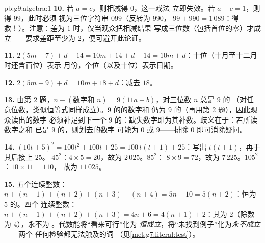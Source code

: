 \begin{solution}{pb:g9:algebra:1}
\textbf{10.} 若 $a = c$，则相减得 $0$，这一戏法
立即失效。若 $a - c = 1$，则得 $99$，此时必须
视为三位字符串 $099$（反转为 $990$，
$99 + 990 = 1\,089$：得救！）。注意：差为
$1$ 时，仅当观众把相减结果
写成三位数（包括首位的零）才成立——要求差距至少为
$2$，便可避开此论证。

\textbf{11.} $2(5m + 7) + d - 14 = 10m + 14 + d - 14 =
10m + d$：十位（十月至十二月时还含百位）表示
月份，个位（以及十位）表示日期。

\textbf{12.} $2(5m + 9) + d = 10m + 18 + d$：减去 $18$。

\textbf{13.} 由第 2 题，$n - (\text{数字和 } n) =
9(11a + b)$，对三位数 $n$ 总是 $9$ 的
（对任意位数，类似恒等式同样成立）。$9$ 的的数字和
仍为 $9$ 的（再用第 2 题），因此观众读出的数字
必须补足到下一个
$9$ 的：缺失数字即为其补数。歧义在于：若所读数字之和
已是 $9$ 的，则划去的数字
可能为 $0$ 或 $9$——排除 $0$ 即可消除疑问。

\textbf{14.} $(10t + 5)^2 = 100t^2 + 100t + 25 =
100\,t(t + 1) + 25$：写出 $t(t+1)$，再于其后接上 $25$。
$45^2$：$4 \times 5 = 20$，故为 $2\,025$。$85^2$：
$8 \times 9 = 72$，故为 $7\,225$。$105^2$：$10 \times 11 = 110$，
故为 $11\,025$。

\textbf{15.} 五个连续整数：$n + (n+1) + (n+2) + (n+3) +
(n+4) = 5n + 10 = 5(n + 2)$：恒为 $5$ 的。四个
连续整数：$n + (n+1) + (n+2) + (n+3) = 4n + 6 =
4(n + 1) + 2$：其为 $2$（除数为 $4$），永不为
。代数能将“看来可行”化为
\emph{恒成立}，将“未找到例子”化为\emph{永不成立}——两个
任何检验都无法触及的词
（见\cref{met:g7:literal:test}）。
\end{solution}
